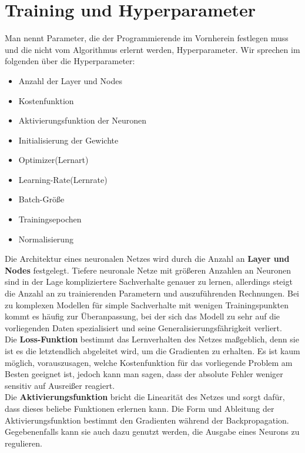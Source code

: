 \section{Training und Hyperparameter}
Man nennt Parameter, die der Programmierende im Vornherein festlegen muss und die nicht vom Algorithmus erlernt werden, Hyperparameter. Wir sprechen im folgenden über die Hyperparameter:
\begin{multicols}{2}
\begin{itemize}
	\setlength\itemsep{0.1cm}
	\setlength{\parskip}{0.1cm}
	\item Anzahl der Layer und Nodes
	\item Kostenfunktion
	\item Aktivierungsfunktion der Neuronen
	\item Initialisierung der Gewichte
	\item Optimizer(Lernart) 
	\item Learning-Rate(Lernrate)
	\item Batch-Größe
	\item Trainingsepochen
	\item Normalisierung
\end{itemize}
\end{multicols}
Die Architektur eines neuronalen Netzes wird durch die Anzahl an \textbf{Layer und Nodes} festgelegt.
Tiefere neuronale Netze mit größeren Anzahlen an Neuronen sind in der Lage kompliziertere Sachverhalte genauer zu lernen, allerdings steigt die Anzahl an zu trainierenden Parametern und auszuführenden Rechnungen. Bei zu komplexen Modellen für simple Sachverhalte mit wenigen Trainingspunkten kommt es häufig zur Überanpassung, bei der sich das Modell zu sehr auf die vorliegenden Daten spezialisiert und seine Generalisierungsfährigkeit verliert.\\
\newline
Die \textbf{Loss-Funktion} bestimmt das Lernverhalten des Netzes maßgeblich, denn sie ist es die letztendlich abgeleitet wird, um die Gradienten zu erhalten. Es ist kaum möglich, vorauszusagen, welche Kostenfunktion für das vorliegende Problem am Besten geeignet ist, jedoch kann man sagen, dass der absolute Fehler weniger sensitiv auf Ausreißer reagiert. \\
\newline
Die \textbf{Aktivierungsfunktion} bricht die Linearität des Netzes und sorgt dafür, dass dieses beliebe Funktionen erlernen kann.  Die Form und Ableitung der Aktivierungsfunktion bestimmt den Gradienten während der Backpropagation. Gegebenenfalls kann sie auch dazu genutzt werden, die Ausgabe eines Neurons zu regulieren. \\
